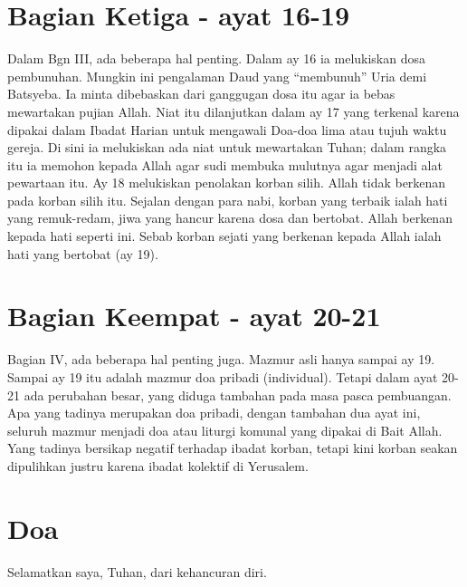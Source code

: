 \documentclass[a4paper]{article}
\begin{document}
\section*{Bagian Ketiga - ayat 16-19}
Dalam Bgn III, ada beberapa hal penting. Dalam ay 16 ia melukiskan dosa pembunuhan. Mungkin ini pengalaman Daud yang “membunuh” Uria demi Batsyeba. Ia minta dibebaskan dari ganggugan dosa itu agar ia bebas mewartakan pujian Allah. Niat itu dilanjutkan dalam ay 17 yang terkenal karena dipakai dalam Ibadat Harian untuk mengawali Doa-doa lima atau tujuh waktu gereja. Di sini ia melukiskan ada niat untuk mewartakan Tuhan; dalam rangka itu ia memohon kepada Allah agar sudi membuka mulutnya agar menjadi alat pewartaan itu. Ay 18 melukiskan penolakan korban silih. Allah tidak berkenan pada korban silih itu. Sejalan dengan para nabi, korban yang terbaik ialah hati yang remuk-redam, jiwa yang hancur karena dosa dan bertobat. Allah berkenan kepada hati seperti ini. Sebab korban sejati yang berkenan kepada Allah ialah hati yang bertobat (ay 19). 

\section*{Bagian Keempat - ayat 20-21}
Bagian IV, ada beberapa hal penting juga. Mazmur asli hanya sampai ay 19. Sampai ay 19 itu adalah mazmur doa pribadi (individual). Tetapi dalam ayat 20-21 ada perubahan besar, yang diduga tambahan pada masa pasca pembuangan. Apa yang tadinya merupakan doa pribadi, dengan tambahan dua ayat ini, seluruh mazmur menjadi doa atau liturgi komunal yang dipakai di Bait Allah. Yang tadinya bersikap negatif terhadap ibadat korban, tetapi kini korban seakan dipulihkan justru karena ibadat kolektif di Yerusalem.

\section*{Doa}
 Selamatkan saya, Tuhan, dari kehancuran diri.
 
\end{document}
